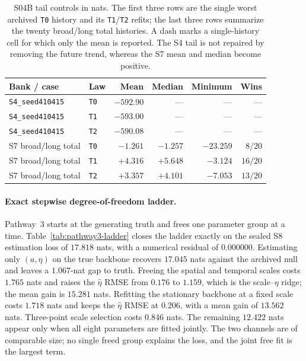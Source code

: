 \begin{table}[htbp]\centering\small
\setlength{\tabcolsep}{4.5pt}
\begin{tabular}{@{}llrrrr@{}}\toprule
Bank / case & Law & Mean & Median & Minimum & Wins\\\midrule
\texttt{S4\_seed410415} & \texttt{T0} & $-592.90$ & --- & --- & ---\\
\texttt{S4\_seed410415} & \texttt{T1} & $-593.00$ & --- & --- & ---\\
\texttt{S4\_seed410415} & \texttt{T2} & $-590.08$ & --- & --- & ---\\
S7 broad/long total & \texttt{T0} & $-1.261$ & $-1.257$ & $-23.259$ & $8/20$\\
S7 broad/long total & \texttt{T1} & $+4.316$ & $+5.648$ & $-3.124$ & $16/20$\\
S7 broad/long total & \texttt{T2} & $+3.357$ & $+4.101$ & $-7.053$ & $13/20$\\
\bottomrule\end{tabular}
\caption{S04B tail controls in nats. The first three rows are the single worst archived \texttt{T0} history and its \texttt{T1}/\texttt{T2} refits; the last three rows summarize the twenty broad/long total histories. A dash marks a single-history cell for which only the mean is reported. The S4 tail is not repaired by removing the future trend, whereas the S7 mean and median become positive.}
\label{tab:pathway2-s04b}
\end{table}

\paragraph{Exact stepwise degree-of-freedom ladder.}
Pathway~3 starts at the generating truth and frees one parameter group at a time. Table~\ref{tab:pathway3-ladder} closes the ladder exactly on the sealed S8 estimation loss of $17.818$ nats, with a numerical residual of $0.000000$. Estimating only $(a,\eta)$ on the true backbone recovers $17.045$ nats against the archived null and leaves a $1.067$-nat gap to truth. Freeing the spatial and temporal scales costs $1.765$ nats and raises the $\hat\eta$ RMSE from $0.176$ to $1.159$, which is the scale--$\eta$ ridge; the mean gain is $15.281$ nats. Refitting the stationary backbone at a fixed scale costs $1.718$ nats and keeps the $\hat\eta$ RMSE at $0.206$, with a mean gain of $13.562$ nats. Three-point scale selection costs $0.846$ nats. The remaining $12.422$ nats appear only when all eight parameters are fitted jointly. The two channels are of comparable size; no single freed group explains the loss, and the joint free fit is the largest term.

